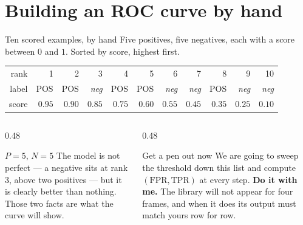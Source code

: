 \documentclass[aspectratio=169]{beamer}
\newcommand{\TPR}{\mathrm{TPR}}
\newcommand{\FPR}{\mathrm{FPR}}
\begin{document}
\section[ROC]{Building an ROC curve by hand}
\label{sec:rochand}

\begin{frame}[shrink=7]{Ten scored examples, by hand}
Five positives, five negatives, each with a score between $0$ and $1$. Sorted
by score, highest first.
  \begin{center}\small
  \begin{tabular}{@{}rrrrrrrrrrr@{}}
    \toprule
    rank  & 1 & 2 & 3 & 4 & 5 & 6 & 7 & 8 & 9 & 10\\
    label & POS & POS & \emph{neg} & POS & POS & \emph{neg} & \emph{neg} &
            POS & \emph{neg} & \emph{neg}\\
    score & $0.95$ & $0.90$ & $0.85$ & $0.75$ & $0.60$ & $0.55$ & $0.45$ &
            $0.35$ & $0.25$ & $0.10$\\
    \bottomrule
  \end{tabular}
  \end{center}
  \vspace{0.2em}
  \begin{columns}[T]
    \begin{column}{0.48\textwidth}
      \begin{block}{$P = 5$, $N = 5$}
        \small The model is not perfect --- a negative sits at rank $3$, above
        two positives --- but it is clearly better than nothing. Those two
        facts are what the curve will show.
      \end{block}
    \end{column}
    \begin{column}{0.48\textwidth}
      \begin{alertblock}{Get a pen out now}
        \small We are going to sweep the threshold down this list and compute
        $(\FPR, \TPR)$ at every step. \textbf{Do it with me.} The library will
        not appear for four frames, and when it does its output must match
        yours row for row.
      \end{alertblock}
    \end{column}
  \end{columns}
\end{frame}
\end{document}
